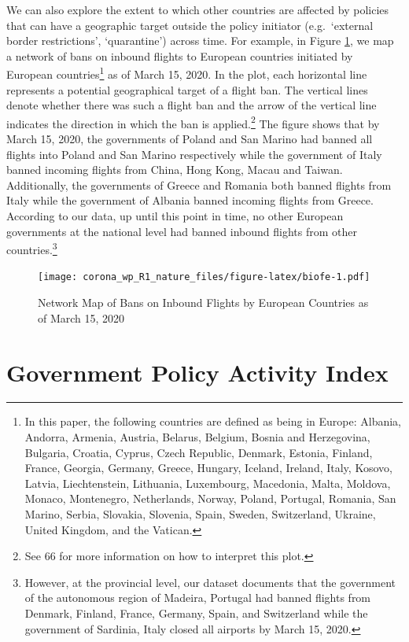 \documentclass[]{article}
\let\rmarkdownfootnote\footnote%
\def\footnote{\protect\rmarkdownfootnote}
\begin{document}
We can also explore the extent to which other countries are affected by policies that can have a geographic target outside the policy initiator (e.g.~`external border restrictions', `quarantine') across time. For example, in Figure \ref{fig:biofe}, we map a network of bans on inbound flights to European countries initiated by European countries\footnote{In this paper, the following countries are defined as being in Europe: Albania, Andorra, Armenia, Austria, Belarus, Belgium, Bosnia and Herzegovina, Bulgaria, Croatia, Cyprus, Czech Republic, Denmark, Estonia, Finland, France, Georgia, Germany, Greece, Hungary, Iceland, Ireland, Italy, Kosovo, Latvia, Liechtenstein, Lithuania, Luxembourg, Macedonia, Malta, Moldova, Monaco, Montenegro, Netherlands, Norway, Poland, Portugal, Romania, San Marino, Serbia, Slovakia, Slovenia, Spain, Sweden, Switzerland, Ukraine, United Kingdom, and the Vatican.} as of March 15, 2020. In the plot, each horizontal line represents a potential geographical target of a flight ban. The vertical lines denote whether there was such a flight ban and the arrow of the vertical line indicates the direction in which the ban is applied.\footnote{See 66 for more information on how to interpret this plot.} The figure shows that by March 15, 2020, the governments of Poland and San Marino had banned all flights into Poland and San Marino respectively while the government of Italy banned incoming flights from China, Hong Kong, Macau and Taiwan. Additionally, the governments of Greece and Romania both banned flights from Italy while the government of Albania banned incoming flights from Greece. According to our data, up until this point in time, no other European governments at the national level had banned inbound flights from other countries.\footnote{However, at the provincial level, our dataset documents that the government of the autonomous region of Madeira, Portugal had banned flights from Denmark, Finland, France, Germany, Spain, and Switzerland while the government of Sardinia, Italy closed all airports by March 15, 2020.}

\begin{figure}
\centering
\texttt{[image: corona\_wp\_R1\_nature\_files/figure-latex/biofe-1.pdf]}
\caption{\label{fig:biofe}Network Map of Bans on Inbound Flights by European Countries as of March 15, 2020}
\end{figure}

\hypertarget{government-policy-activity-index}{%
\section*{Government Policy Activity Index}\label{government-policy-activity-index}}
\end{document}
